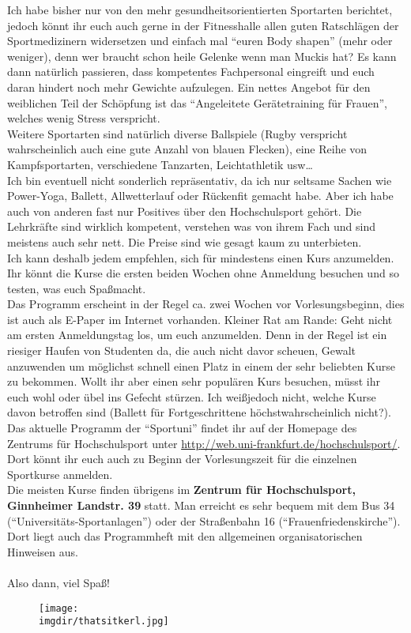 Ich habe bisher nur von den mehr gesundheitsorientierten Sportarten berichtet, jedoch könnt ihr euch auch gerne in der Fitnesshalle allen guten Ratschlägen der Sportmedizinern widersetzen und einfach mal \enquote{euren Body shapen} (mehr oder weniger), denn wer braucht schon heile Gelenke wenn man Muckis hat? Es kann dann natürlich passieren, dass kompetentes Fachpersonal eingreift und euch daran hindert noch mehr Gewichte aufzulegen. Ein nettes Angebot für den weiblichen Teil der Schöpfung ist das \enquote{Angeleitete Gerätetraining für Frauen}, welches wenig Stress verspricht.\\
Weitere Sportarten sind natürlich diverse Ballspiele (Rugby verspricht wahrscheinlich auch eine gute Anzahl von blauen Flecken), eine Reihe von Kampfsportarten, verschiedene Tanzarten, Leichtathletik usw\ldots\\
Ich bin eventuell nicht sonderlich repräsentativ, da ich nur seltsame Sachen wie Power-Yoga, Ballett, Allwetterlauf oder Rückenfit gemacht habe. Aber ich habe auch von anderen fast nur Positives über den Hochschulsport gehört. Die Lehrkräfte sind wirklich kompetent, verstehen was von ihrem Fach und sind meistens auch sehr nett. Die Preise sind wie gesagt kaum zu unterbieten.\\
Ich kann deshalb jedem empfehlen, sich für mindestens einen Kurs anzumelden. Ihr könnt die Kurse die ersten beiden Wochen ohne Anmeldung besuchen und so testen, was euch Spa\ss  macht.\\
Das Programm erscheint in der Regel ca. zwei Wochen vor Vorlesungsbeginn, dies ist auch als E-Paper im Internet vorhanden. Kleiner Rat am Rande: Geht nicht am ersten Anmeldungstag los, um euch anzumelden. Denn in der Regel ist ein riesiger Haufen von Studenten da, die auch nicht davor scheuen, Gewalt anzuwenden um möglichst schnell einen Platz in einem der sehr beliebten Kurse zu bekommen. Wollt ihr aber einen sehr populären Kurs besuchen, müsst ihr euch wohl oder übel ins Gefecht stürzen. Ich wei\ss  jedoch nicht, welche Kurse davon betroffen sind (Ballett für Fortgeschrittene höchstwahrscheinlich nicht?).\\
Das aktuelle Programm der \enquote{Sportuni} findet ihr auf der Homepage des Zentrums für Hochschulsport unter \url{http://web.uni-frankfurt.de/hochschulsport/}. Dort könnt ihr euch auch zu Beginn der Vorlesungszeit für die einzelnen Sportkurse anmelden.\\
Die meisten Kurse finden übrigens im \textbf{Zentrum für Hochschulsport, Ginnheimer Landstr. 39} statt. Man erreicht es sehr bequem mit dem Bus 34 (\enquote{Universitäts-Sportanlagen}) oder der Stra\ss enbahn 16 (\enquote{Frauenfriedenskirche}). Dort liegt auch das Programmheft mit den allgemeinen organisatorischen Hinweisen aus.\\\\
Also dann, viel Spa\ss !
\begin{figure}[!h]
	\centering
  	\texttt{[image: \\imgdir/thatsitkerl.jpg]}
\end{figure}